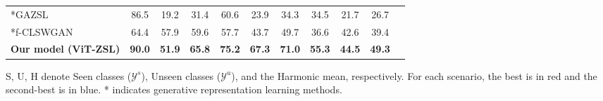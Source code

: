 \documentclass[a4paper,11pt]{article}
\begin{document}
\begin{table} [!h]
\begin{threeparttable}
\begin{tabular}{|l|c|c|c|c|c|c|c|c|c|c|}
*GAZSL \cite{GAZSL}   & 86.5 & 19.2 & 31.4  & 60.6 & 23.9 & 34.3 & 34.5 & 21.7 & 26.7 \\
*f-CLSWGAN \cite{8578679} & 64.4 & {\color{red}57.9} & 59.6  & 57.7 & 43.7 & 49.7 & 36.6 & 42.6 & {\color{blue}39.4} \\


\hline
\textbf{Our model (ViT-ZSL)} & \textbf{{90.0}} & \textbf{51.9} & \textbf{{\color{red}65.8}} & \textbf{{\color{blue}75.2}} & \textbf{{\color{red}67.3}} & \textbf{{\color{red}71.0}} & \textbf{{\color{red}55.3}} & \textbf{{\color{red}44.5}} & \textbf{{\color{red}49.3}} \\ \hline
\end{tabular} 

\begin{tablenotes}
\small
\item S, U, H denote Seen classes ($\mathcal{Y}^s$), Unseen classes ($\mathcal{Y}^u$), and the Harmonic mean, respectively. For each scenario, the best is in {\color{red}red} and the second-best is in {\color{blue}blue}. * indicates generative representation learning methods. 
\end{tablenotes}
\end{threeparttable}
\end{table}
\end{document}

